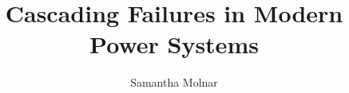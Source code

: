 \documentclass[12pt]{report}
\begin{document}
\title{\LARGE {\bf Cascading Failures in Modern Power Systems}\\
 \vspace*{6mm}
}

\author{Samantha Molnar}

\normallinespacing
\maketitle

\preface

%
%
%

\body







\appendix




	
\end{document}

